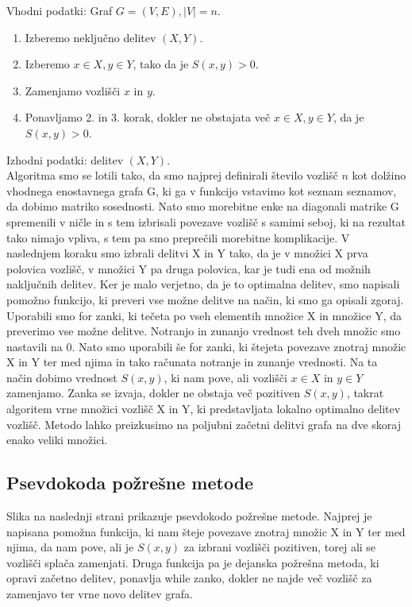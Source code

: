 \documentclass[12pt,a4paper]{amsart}
\theoremstyle{definition} %
\theoremstyle{plain} %
\begin{document}
Vhodni podatki: Graf $G=(V,E), |V|=n$.
\begin{enumerate}
\item Izberemo neključno delitev $(X,Y)$.
\item Izberemo $x\in X, y\in Y$, tako da je $S(x,y)>0$.
\item Zamenjamo vozlišči $x$ in $y$.
\item Ponavljamo 2. in 3. korak, dokler ne obstajata več $x\in X, y\in Y$, da je $S(x,y)>0$.
\end{enumerate}
Izhodni podatki: delitev $(X,Y)$. \\

Algoritma smo se lotili tako, da smo najprej definirali število vozlišč $n$ kot dolžino vhodnega enostavnega grafa G, ki ga v funkcijo vstavimo kot seznam seznamov, da dobimo matriko sosednosti. Nato smo morebitne enke na diagonali matrike G spremenili v ničle in s tem izbrisali povezave vozlišč s samimi seboj, ki na rezultat tako nimajo vpliva, s tem pa smo preprečili morebitne komplikacije. V naslednjem koraku smo izbrali delitvi X in Y tako, da je v množici X prva polovica vozlišč, v množici Y pa druga polovica, kar je tudi ena od možnih naključnih delitev. Ker je malo verjetno, da je to optimalna delitev, smo napisali pomožno funkcijo, ki preveri vse možne delitve na način, ki smo ga opisali zgoraj. Uporabili smo for zanki, ki tečeta po vseh elementih množice X in množice Y, da preverimo vse možne delitve. Notranjo in zunanjo vrednost teh dveh množic smo nastavili na 0. Nato smo uporabili še for zanki, ki štejeta povezave znotraj množic X in Y ter med njima in tako računata notranje in zunanje vrednosti. Na ta način dobimo vrednost $S(x,y)$, ki nam pove, ali vozlišči $x\in X$ in $y\in Y$ zamenjamo. Zanka se izvaja, dokler ne obstaja več pozitiven $S(x,y)$, takrat algoritem vrne množici vozlišč X in Y, ki predstavljata lokalno optimalno delitev vozlišč. Metodo lahko preizkusimo na poljubni začetni delitvi grafa na dve skoraj enako veliki množici. \\



\subsection{Psevdokoda požrešne metode}

Slika na naslednji strani prikazuje psevdokodo požrešne metode. Najprej je napisana pomožna funkcija, ki nam šteje povezave znotraj množic X in Y ter med njima, da nam pove, ali je $S(x,y)$ za izbrani vozlišči pozitiven, torej ali se vozlišči splača zamenjati. Druga funkcija pa je dejanska požrešna metoda, ki opravi začetno delitev, ponavlja while zanko, dokler ne najde več vozlišč za zamenjavo ter vrne novo delitev grafa. 
\end{document}
